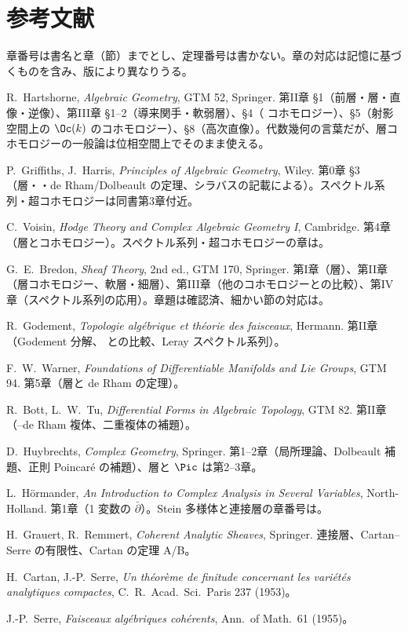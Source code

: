 \section*{参考文献}
章番号は書名と章（節）までとし、定理番号は書かない。章の対応は記憶に基づくものを含み、版により異なりうる\tQ。
\begin{enumerate}[label={[\arabic*]},leftmargin=2.4em]
\item R.~Hartshorne, \emph{Algebraic Geometry}, GTM 52, Springer. 第II章 §1（前層・層・直像・逆像）、第III章 §1--2（導来関手・軟弱層）、§4（\Cech{} コホモロジー）、§5（射影空間上の $\Oc(k)$ のコホモロジー）、§8（高次直像）。代数幾何の言葉だが、層コホモロジーの一般論は位相空間上でそのまま使える。
\item P.~Griffiths, J.~Harris, \emph{Principles of Algebraic Geometry}, Wiley. 第0章 §3（層・\Cech{}・de Rham/Dolbeault の定理、シラバスの記載による）。スペクトル系列・超コホモロジーは同書第3章付近\tQ。
\item C.~Voisin, \emph{Hodge Theory and Complex Algebraic Geometry I}, Cambridge. 第4章（層とコホモロジー）。スペクトル系列・超コホモロジーの章は\tQ。
\item G.~E.~Bredon, \emph{Sheaf Theory}, 2nd ed., GTM 170, Springer. 第I章（層）、第II章（層コホモロジー、軟層・細層）、第III章（他のコホモロジーとの比較）、第IV章（スペクトル系列の応用）。章題は確認済、細かい節の対応は\tQ。
\item R.~Godement, \emph{Topologie alg\'ebrique et th\'eorie des faisceaux}, Hermann. 第II章（Godement 分解、\Cech{} との比較、Leray スペクトル系列）。
\item F.~W.~Warner, \emph{Foundations of Differentiable Manifolds and Lie Groups}, GTM 94. 第5章（層と de Rham の定理）。
\item R.~Bott, L.~W.~Tu, \emph{Differential Forms in Algebraic Topology}, GTM 82. 第II章（\Cech{}--de Rham 複体、二重複体の補題）。
\item D.~Huybrechts, \emph{Complex Geometry}, Springer. 第1--2章（局所理論、Dolbeault 補題、正則 Poincar\'e の補題）、層と $\Pic$ は第2--3章\tQ。
\item L.~H\"ormander, \emph{An Introduction to Complex Analysis in Several Variables}, North-Holland. 第1章（1 変数の $\bar\partial$）。Stein 多様体と連接層の章番号は\tQ。
\item H.~Grauert, R.~Remmert, \emph{Coherent Analytic Sheaves}, Springer. 連接層、Cartan--Serre の有限性、Cartan の定理 A/B。
\item H.~Cartan, J.-P.~Serre, \emph{Un th\'eor\`eme de finitude concernant les vari\'et\'es analytiques compactes}, C.~R.~Acad.~Sci.~Paris 237 (1953)\tQ。
\item J.-P.~Serre, \emph{Faisceaux alg\'ebriques coh\'erents}, Ann.~of Math.~61 (1955)\tQ。
\end{enumerate}

